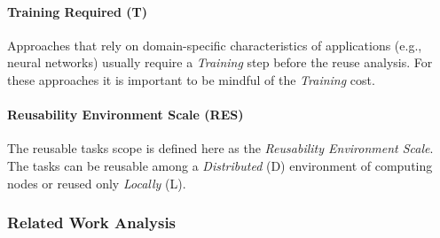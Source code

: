 \paragraph{Training Required (T)}

Approaches that rely on domain-specific characteristics of applications (e.g., neural networks) usually require a {\it Training} step before the reuse analysis. For these approaches it is important to be mindful of the {\it Training} cost.

\paragraph{Reusability Environment Scale (RES)}

The reusable tasks scope is defined here as the {\it Reusability Environment Scale}. The tasks can be reusable among a {\it Distributed} (D) environment of computing nodes or reused only {\it Locally} (L). 





\subsubsection{Related Work Analysis}

